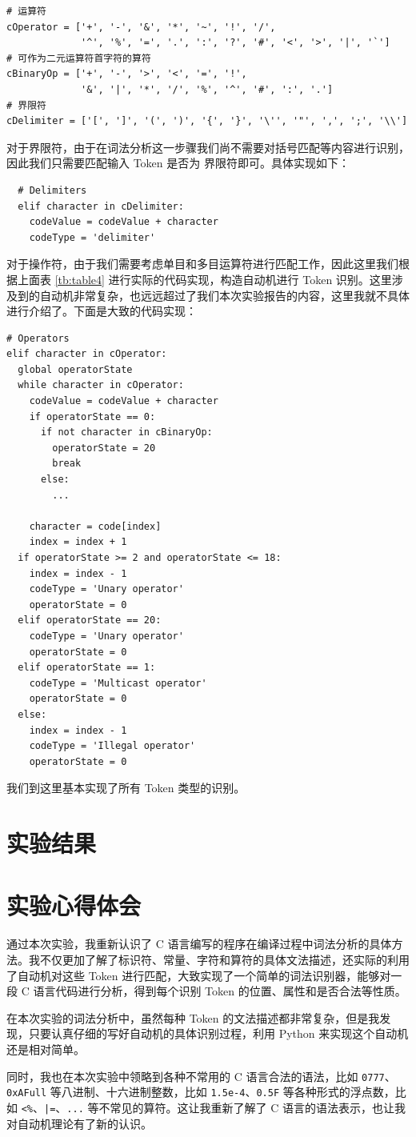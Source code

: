 \documentclass[UTF8]{ctexart}
\begin{document}
\begin{verbatim}
# 运算符
cOperator = ['+', '-', '&', '*', '~', '!', '/',
             '^', '%', '=', '.', ':', '?', '#', '<', '>', '|', '`']
# 可作为二元运算符首字符的算符
cBinaryOp = ['+', '-', '>', '<', '=', '!',
             '&', '|', '*', '/', '%', '^', '#', ':', '.']
# 界限符
cDelimiter = ['[', ']', '(', ')', '{', '}', '\'', '"', ',', ';', '\\']
\end{verbatim}

对于界限符，由于在词法分析这一步骤我们尚不需要对括号匹配等内容进行识别，因此我们只需要匹配输入 Token 是否为 界限符即可。具体实现如下：

\begin{verbatim}
  # Delimiters
  elif character in cDelimiter:
    codeValue = codeValue + character
    codeType = 'delimiter'
\end{verbatim}

对于操作符，由于我们需要考虑单目和多目运算符进行匹配工作，因此这里我们根据上面表 \ref{tb:table4} 进行实际的代码实现，构造自动机进行 Token 识别。这里涉及到的自动机非常复杂，也远远超过了我们本次实验报告的内容，这里我就不具体进行介绍了。下面是大致的代码实现：

\begin{verbatim}
# Operators
elif character in cOperator:
  global operatorState
  while character in cOperator:
    codeValue = codeValue + character
    if operatorState == 0:
      if not character in cBinaryOp:
        operatorState = 20
        break
      else:
        ...

    character = code[index]
    index = index + 1
  if operatorState >= 2 and operatorState <= 18:
    index = index - 1
    codeType = 'Unary operator'
    operatorState = 0
  elif operatorState == 20:
    codeType = 'Unary operator'
    operatorState = 0
  elif operatorState == 1:
    codeType = 'Multicast operator'
    operatorState = 0
  else:
    index = index - 1
    codeType = 'Illegal operator'
    operatorState = 0
\end{verbatim}

我们到这里基本实现了所有 Token 类型的识别。

\section{实验结果}

\section{实验心得体会}
通过本次实验，我重新认识了 C 语言编写的程序在编译过程中词法分析的具体方法。我不仅更加了解了标识符、常量、字符和算符的具体文法描述，还实际的利用了自动机对这些 Token 进行匹配，大致实现了一个简单的词法识别器，能够对一段 C 语言代码进行分析，得到每个识别 Token 的位置、属性和是否合法等性质。

在本次实验的词法分析中，虽然每种 Token 的文法描述都非常复杂，但是我发现，只要认真仔细的写好自动机的具体识别过程，利用 Python 来实现这个自动机还是相对简单。

同时，我也在本次实验中领略到各种不常用的 C 语言合法的语法，比如 \texttt{0777}、\texttt{0xAFull} 等八进制、十六进制整数，比如 \texttt{1.5e-4}、\texttt{0.5F} 等各种形式的浮点数，比如 \texttt{<\%}、\texttt{|=}、\texttt{...} 等不常见的算符。这让我重新了解了 C 语言的语法表示，也让我对自动机理论有了新的认识。
\end{document}
